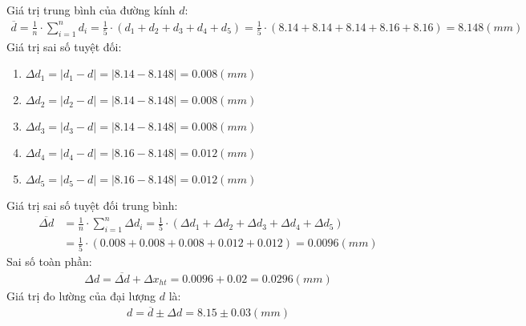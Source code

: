 \documentclass{article}
\begin{document}
Giá trị trung bình của đường kính $d$:
\begin{align*}
    \overline{d} = \frac{1}{n}\cdot\sum_{i = 1}^{n}d_i = \frac{1}{5}\cdot(d_1 + d_2 + d_3 + d_4 + d_5) = \frac{1}{5}\cdot(8.14 + 8.14 + 8.14 + 8.16 + 8.16) = 8.148(mm)
\end{align*}
Giá trị sai số tuyệt đối:
\begin{enumerate}
    \item $\Delta d_1 = |d_1 - d| = |8.14 - 8.148| = 0.008(mm)$
    \item $\Delta d_2 = |d_2 - d| = |8.14 - 8.148| = 0.008(mm)$
    \item $\Delta d_3 = |d_3 - d| = |8.14 - 8.148| = 0.008(mm)$
    \item $\Delta d_4 = |d_4 - d| = |8.16 - 8.148| = 0.012(mm)$
    \item $\Delta d_5 = |d_5 - d| = |8.16 - 8.148| = 0.012(mm)$
\end{enumerate}
Giá trị sai số tuyệt đối trung bình:
\begin{align*}
    \overline{\Delta d} &= \frac{1}{n}\cdot\sum_{i=1}^{n}\Delta d_i = \frac{1}{5}\cdot(\Delta d_1 + \Delta d_2 + \Delta d_3 + \Delta d_4 + \Delta d_5)\\ 
    &=  \frac{1}{5}\cdot(0.008 + 0.008 + 0.008 + 0.012 + 0.012) = 0.0096(mm)
\end{align*}
Sai số toàn phần:
\begin{align*}
    \Delta d = \overline{\Delta d} + \Delta x_{ht} =0.0096 + 0.02 =0.0296(mm) 
\end{align*}
Giá trị đo lường của đại lượng $d$ là:
\begin{align*}
    d = \overline{d} \pm \Delta d = 8.15 \pm 0.03(mm)
\end{align*}
\end{document}
